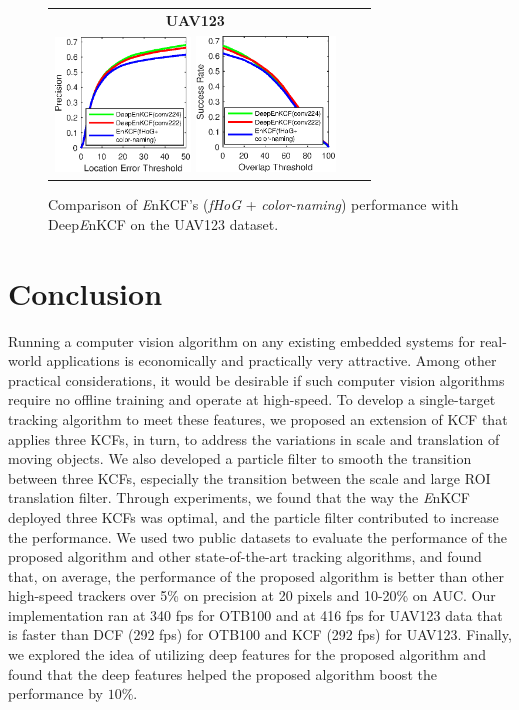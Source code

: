 \documentclass[10pt,twocolumn,letterpaper]{article}
\begin{document}
\begin{figure}[!h]
\centering
\begin{tabular}{ccc}
\tiny\quad\quad\textbf{UAV123}\\
\includegraphics[width=3.60cm]{./figures/pr_deep.eps}
\includegraphics[width=3.70cm]{./figures/sr_deep.eps}\\
\end{tabular}
\caption{Comparison of {\it E}nKCF's ({\it fHoG} + {\it color-naming}) 
performance with Deep{\it E}nKCF on the UAV123
dataset.}
\label{fig:UAV123_DATASET_DeepFeatures}
\end{figure}

\section{Conclusion} \label{sc:Conclusion}
Running a computer vision algorithm on any existing embedded systems
for real-world applications is economically and practically very
attractive. Among other practical considerations, it would be
desirable if such computer vision algorithms require no offline
training and operate at high-speed. To develop a single-target
tracking algorithm to meet these features, we proposed an extension of
KCF that applies three KCFs, in turn, to address the variations in
scale and translation of moving objects. We also developed a particle
filter to smooth the transition between three KCFs, especially the
transition between the scale and large ROI translation filter. Through
experiments, we found that the way the {\it E}nKCF deployed three KCFs
was optimal, and the particle filter contributed to increase the
performance.  We used two public datasets to evaluate the performance
of the proposed algorithm and other state-of-the-art tracking
algorithms, and found that, on average, the performance of the
proposed algorithm is better than other high-speed trackers over 5\%
on precision at 20 pixels and 10-20\% on AUC. Our implementation ran
at 340 fps for OTB100 and at 416 fps for UAV123 data that is faster
than DCF (292 fps) for OTB100 and KCF (292 fps) for UAV123. Finally,
we explored the idea of utilizing deep features for the proposed
algorithm and found that the deep features helped the proposed
algorithm boost the performance by $10\%$.
\end{document}
